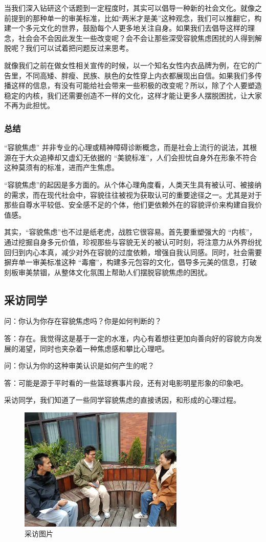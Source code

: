 当我们深入钻研这个话题到一定程度时，其实可以倡导一种新的社会文化。就像之前提到的那种单一的审美标准，比如``两米才是美''这种观念，我们可以推翻它，构建一个多元文化的世界，鼓励每个人更多地关注自身。如果我们去倡导这样的理念，社会会不会因此发生一些改变呢？会不会让那些深受容貌焦虑困扰的人得到解脱呢？我们可以试着把问题反过来思考。

就像我们之前在做女性相关宣传的时候，以一个知名女性内衣品牌为例，在它的广告里，不同高矮、胖瘦、民族、肤色的女性穿上内衣都展现出自信。如果我们多传播这样的信息，有没有可能给社会带来一些积极的改变呢？所以，除了个人要塑造稳定的内核，我们还需要创造不一样的文化，这样才能让更多人摆脱困扰，让大家不再为此担忧。

\subsubsection{总结}
``容貌焦虑'' 并非专业的心理或精神障碍诊断概念，而是社会上流行的说法，其根源在于大众追捧却又虚幻无依据的 ``美貌标准''，人们会担忧自身外在形象不符合这种莫须有的标准，进而产生焦虑。

``容貌焦虑''的起因是多方面的。从个体心理角度看，人类天生具有被认可、被接纳的需求，而在现代社会中，容貌往往被视为获取认可的重要途径之一。尤其是对于那些自尊水平较低、安全感不足的个体，他们更依赖外在的容貌评价来构建自我价值感。

其实，``容貌焦虑''也不过是纸老虎，战胜它很容易。首先要重塑强大的 ``内核''，通过挖掘自身多元价值，珍视那些与容貌无关的被认可时刻，将注意力从外界纷扰回归到内心本真，减少对外在容貌的过度依赖，增强自我认同感。同时，社会需要摒弃单一审美标准这种 ``毒瘤''，构建多元包容的文化，倡导多元美的信息，打破刻板审美禁锢，从整体文化氛围上帮助人们摆脱容貌焦虑的困扰。

\subsection{采访同学}
问：你认为你存在容貌焦虑吗？你是如何判断的？

答：存在。我觉得这是基于一定的水准，内心有着想往更加向善向好的容貌方向发展的渴望，同时也夹杂着一种焦虑感和攀比心理吧。

问：你认为你的这种审美认识是如何产生的呢？

答：可能是源于平时看的一些篮球赛事片段，还有对电影明星形象的印象吧。

采访同学，我们知道了一些同学容貌焦虑的直接诱因，和形成的心理过程。
\begin{figure}[H]
    \centering
    \includegraphics[width=0.7\textwidth]{./assets/采访.jpg}
    \caption{采访图片}
\end{figure}